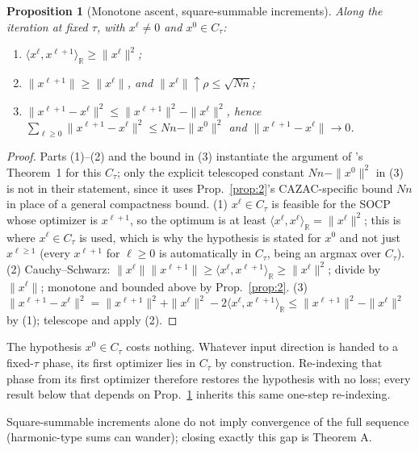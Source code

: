 \documentclass[11pt]{article}
\theoremstyle{plain}
\newtheorem{proposition}[theorem]{Proposition}
\theoremstyle{definition}
\theoremstyle{remark}
\newcommand{\R}{\mathbb R}
\begin{document}
\begin{proposition}[Monotone ascent, square-summable increments]\label{prop:3}
Along the iteration at fixed $\tau$, with $x^\ell\ne0$ and \textbf{$x^0\in
C_\tau$}:
\begin{enumerate}
\item[\rm(1)] $\langle x^\ell,x^{\ell+1}\rangle_\R\ge\|x^\ell\|^2$;
\item[\rm(2)] $\|x^{\ell+1}\|\ge\|x^\ell\|$, and $\|x^\ell\|\uparrow\rho\le\sqrt{Nn}$;
\item[\rm(3)] $\|x^{\ell+1}-x^\ell\|^2\le\|x^{\ell+1}\|^2-\|x^\ell\|^2$, hence
$\sum_{\ell\ge0}\|x^{\ell+1}-x^\ell\|^2\le Nn-\|x^0\|^2$ and
$\|x^{\ell+1}-x^\ell\|\to0$.
\end{enumerate}
\end{proposition}
\begin{proof}
Parts (1)--(2) and the bound in (3) instantiate the argument of
\cite{FKP21}'s Theorem~1 for this $C_\tau$; only the explicit telescoped
constant $Nn-\|x^0\|^2$ in (3) is not in their statement, since it uses
Prop.~\ref{prop:2}'s CAZAC-specific bound $Nn$ in place of a general
compactness bound.
(1) $x^\ell\in C_\tau$ is feasible for the SOCP whose optimizer is
$x^{\ell+1}$, so the optimum is at least $\langle x^\ell,x^\ell\rangle_\R=\|x^\ell\|^2$;
this is where $x^\ell\in C_\tau$ is used, which is why the hypothesis is
stated for $x^0$ and not just $x^{\ell\ge1}$ (every $x^{\ell+1}$ for
$\ell\ge0$ is automatically in $C_\tau$, being an argmax over $C_\tau$).
(2) Cauchy--Schwarz: $\|x^\ell\|\|x^{\ell+1}\|\ge\langle x^\ell,x^{\ell+1}\rangle_\R\ge\|x^\ell\|^2$;
divide by $\|x^\ell\|$; monotone and bounded above by Prop.~\ref{prop:2}.
(3) $\|x^{\ell+1}-x^\ell\|^2=\|x^{\ell+1}\|^2+\|x^\ell\|^2-2\langle x^\ell,x^{\ell+1}\rangle_\R\le\|x^{\ell+1}\|^2-\|x^\ell\|^2$
by (1); telescope and apply (2).
\end{proof}

The hypothesis $x^0\in C_\tau$ costs nothing.  Whatever input direction is
handed to a fixed-$\tau$ phase, its first optimizer lies in $C_\tau$ by
construction.  Re-indexing that phase from its first optimizer therefore
restores the hypothesis with no loss; every result below that depends on
Prop.~\ref{prop:3} inherits this same one-step re-indexing.

Square-summable increments alone do not imply convergence of the full
sequence (harmonic-type sums can wander); closing exactly this gap is
Theorem A.
\end{document}
